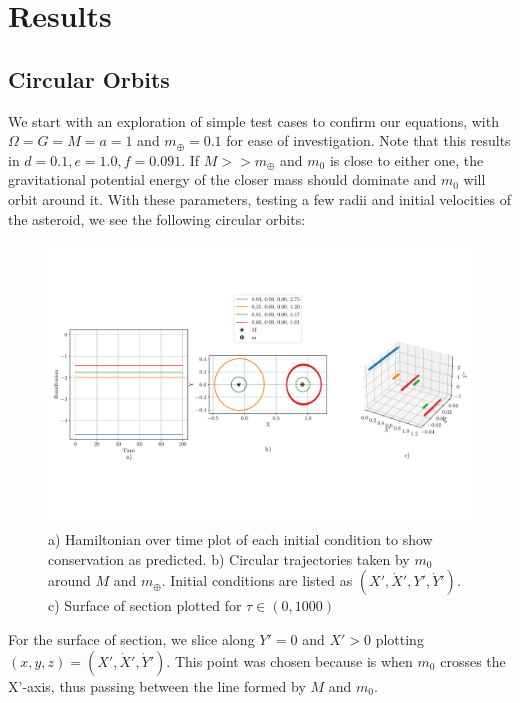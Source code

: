 \documentclass[11pt]{article}
\begin{document}


\section{Results}
\label{sec:Results}
\subsection{Circular Orbits}
 We start with an exploration of simple test cases to confirm our equations, with $\Omega=G=M=a=1$ and $m_\oplus=0.1$ for ease of investigation. Note that this results in $d=0.1, e=1.0, f=0.091$. If $M >> m_\oplus$ and $m_0$ is close to either one, the gravitational potential energy of the closer mass should dominate and $m_0$ will orbit around it. With these parameters, testing a few radii and initial velocities of the asteroid, we see the following circular orbits:
\begin{figure}[H]
    \centering
    \includegraphics[width=1\linewidth]{figures/circular_orbits.pdf}
    \caption{a) Hamiltonian over time plot of each initial condition to show conservation as predicted. b) Circular trajectories taken by $m_0$ around $M$ and $m_\oplus$. Initial conditions are listed as $(X', \dot X', Y', \dot Y')$. c) Surface of section plotted for $\tau \in (0,1000)$}
    \label{fig:circular-orbits}
\end{figure}
\noindent
For the surface of section, we slice along $Y'=0$ and $X'>0$ plotting $(x,y,z) = (X',\dot X',\dot Y')$. This point was chosen because is when $m_0$ crosses the X'-axis, thus passing between the line formed by $M$ and $m_0$.
\end{document}
